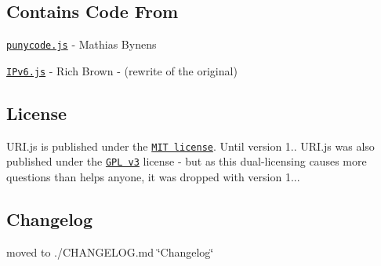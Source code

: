 \subsection*{Contains Code From}


\begin{DoxyItemize}
\item \href{http://mths.be/punycode}{\tt punycode.\+js} -\/ Mathias Bynens
\item \href{http://intermapper.com/support/tools/IPV6-Validator.aspx}{\tt I\+Pv6.\+js} -\/ Rich Brown -\/ (rewrite of the original)
\end{DoxyItemize}

\subsection*{License}

U\+R\+I.\+js is published under the \href{http://www.opensource.org/licenses/mit-license}{\tt M\+IT license}. Until version 1.. U\+R\+I.\+js was also published under the \href{http://opensource.org/licenses/GPL-3.0}{\tt G\+PL v3} license -\/ but as this dual-\/licensing causes more questions than helps anyone, it was dropped with version 1...

\subsection*{Changelog}

moved to ./\+C\+H\+A\+N\+G\+E\+L\+OG.md \char`\"{}\+Changelog\char`\"{} 